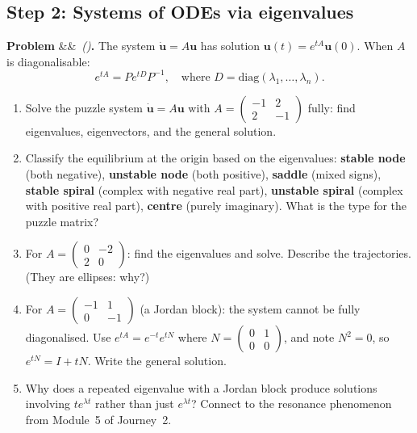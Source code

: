 \documentclass[12pt,a4paper]{article}
\newcounter{problem}
\newenvironment{problem}[1][]{\refstepcounter{problem}\par\vspace{6pt}\noindent\textbf{\color{MidBlue}Problem \theproblem}\ifx&#1&\else\ \textit{(#1)}\fi\textbf{.}\enskip}{\par\vspace{4pt}}
\begin{document}
\subsection{Step 2: Systems of ODEs via eigenvalues}

\begin{problem}
\label{prob:systems_eigen}
The system $\dot{\mathbf{u}} = A\mathbf{u}$ has solution $\mathbf{u}(t) = e^{tA}\mathbf{u}(0)$. When $A$ is diagonalisable:
\[
  e^{tA} = Pe^{tD}P^{-1}, \quad \text{where } D = \text{diag}(\lambda_1,\ldots,\lambda_n).
\]

\begin{enumerate}[label=(\alph*),topsep=2pt]
  \item Solve the puzzle system $\dot{\mathbf{u}} = A\mathbf{u}$ with $A = \begin{pmatrix}-1&2\\2&-1\end{pmatrix}$ fully: find eigenvalues, eigenvectors, and the general solution.
  \item Classify the equilibrium at the origin based on the eigenvalues: \textbf{stable node} (both negative), \textbf{unstable node} (both positive), \textbf{saddle} (mixed signs), \textbf{stable spiral} (complex with negative real part), \textbf{unstable spiral} (complex with positive real part), \textbf{centre} (purely imaginary). What is the type for the puzzle matrix?
  \item For $A = \begin{pmatrix}0&-2\\2&0\end{pmatrix}$: find the eigenvalues and solve. Describe the trajectories. (They are ellipses: why?)
  \item For $A = \begin{pmatrix}-1&1\\0&-1\end{pmatrix}$ (a Jordan block): the system cannot be fully diagonalised. Use $e^{tA} = e^{-t}e^{tN}$ where $N = \begin{pmatrix}0&1\\0&0\end{pmatrix}$, and note $N^2=0$, so $e^{tN} = I + tN$. Write the general solution.
  \item Why does a repeated eigenvalue with a Jordan block produce solutions involving $te^{\lambda t}$ rather than just $e^{\lambda t}$? Connect to the resonance phenomenon from Module~5 of Journey~2.
\end{enumerate}
\end{problem}
\end{document}
